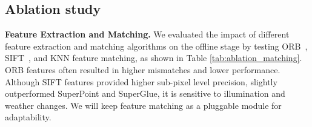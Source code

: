 \begin{table}[h]
\caption{Computational time of our method (in seconds).}
\label{tab:time_analysis}
    \centering
\end{table}

\subsection{Ablation study}

\textbf{Feature Extraction and Matching.}
We evaluated the impact of different feature extraction and matching algorithms on the offline stage by testing ORB~\cite{orb}, SIFT~\cite{Lowe2004DistinctiveIF}, and KNN feature matching, as shown in Table \ref{tab:ablation_matching}. ORB features often resulted in higher mismatches and lower performance. Although SIFT features provided higher sub-pixel level precision, slightly outperformed SuperPoint and SuperGlue, it is sensitive to illumination and weather changes. We will keep feature matching as a pluggable module for adaptability.

\begin{table}[t!]
\caption{Comparisons of different feature matching methods.}
\label{tab:ablation_matching}
    \centering
\end{table}

